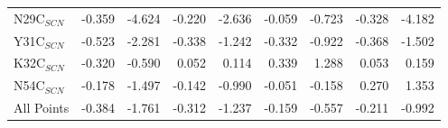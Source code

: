 \documentclass[]{article}
\begin{document}
{\begin{tabular}{ l || r r| r r| r r| r r}
N29C$_{SCN}$   & -0.359         & -4.624         & -0.220         & -2.636         & -0.059         & -0.723         & -0.328         & -4.182        \\
Y31C$_{SCN}$   & -0.523         & -2.281         & -0.338         & -1.242         & -0.332         & -0.922         & -0.368         & -1.502        \\
K32C$_{SCN}$   & -0.320         & -0.590         & 0.052          & 0.114          & 0.339          & 1.288          & 0.053          & 0.159         \\
N54C$_{SCN}$   & -0.178         & -1.497         & -0.142         & -0.990         & -0.051         & -0.158         & 0.270          & 1.353         \\
\hline
All Points     & -0.384         & -1.761         & -0.312         & -1.237         & -0.159         & -0.557         & -0.211         & -0.992        \\
\end{tabular}\\
}\\
\end{document}
